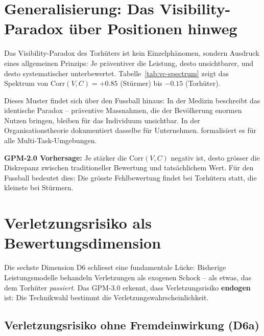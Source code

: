 \documentclass[12pt,a4paper]{article}
\begin{document}
\section{Generalisierung: Das Visibility-Paradox \"uber Positionen hinweg}
\label{sec:generalisierung}

Das Visibility-Paradox des Torh\"uters ist kein Einzelph\"anomen, sondern Ausdruck eines allgemeinen Prinzips: Je pr\"aventiver die Leistung, desto unsichtbarer, und desto systematischer unterbewertet. Tabelle~\ref{tab:vc-spectrum} zeigt das Spektrum von $\text{Corr}(V,C) = +0.85$ (St\"urmer) bis $-0.15$ (Torh\"uter).

Dieses Muster findet sich \"uber den Fussball hinaus: In der Medizin beschreibt \citet{rose1985} das identische Paradox -- pr\"aventive Massnahmen, die der Bev\"olkerung enormen Nutzen bringen, bleiben f\"ur das Individuum unsichtbar. In der Organisationstheorie dokumentiert \citet{kerr1975} dasselbe f\"ur Unternehmen. \citet{holmstrom1991} formalisiert es f\"ur alle Multi-Task-Umgebungen.

\textbf{GPM-2.0 Vorhersage:} Je st\"arker die Corr$(V,C)$ negativ ist, desto gr\"osser die Diskrepanz zwischen traditioneller Bewertung und tats\"achlichem Wert. F\"ur den Fussball bedeutet dies: Die gr\"osste Fehlbewertung findet bei Torh\"utern statt, die kleinste bei St\"urmern.


\section{Verletzungsrisiko als Bewertungsdimension}
\label{sec:verletzungsrisiko}

Die sechste Dimension D6 schliesst eine fundamentale L\"ucke: Bisherige Leistungsmodelle behandeln Verletzungen als exogenen Schock -- als etwas, das dem Torh\"uter \emph{passiert}. Das GPM-3.0 erkennt, dass Verletzungsrisiko \textbf{endogen} ist: Die Technikwahl bestimmt die Verletzungswahrscheinlichkeit.

\subsection{Verletzungsrisiko ohne Fremdeinwirkung (D6a)}
\end{document}
